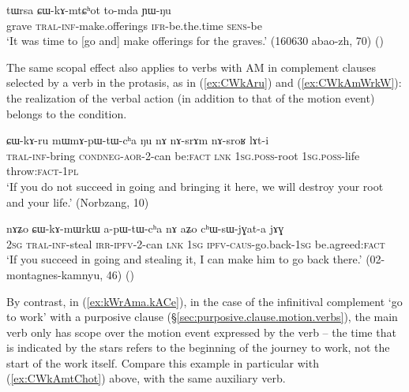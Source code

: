 \begin{exe}
\ex \label{ex:CWkAmtChot}
\gll tɯrsa ɕɯ-kɤ-mtɕʰot to-mda ɲɯ-ŋu \\
grave \textsc{tral}-\textsc{inf}-make.offerings \textsc{ifr}-be.the.time \textsc{sens}-be \\
\glt `It was time to [go and] make offerings for the graves.' (160630 abao-zh, 70) ()
 \end{exe} 
 
The same scopal effect also applies to  verbs with AM in complement clauses selected by a verb in the protasis, as in (\ref{ex:CWkAru}) and (\ref{ex:CWkAmWrkW}): the realization of the verbal action (in addition to that of the motion event) belongs to the condition.

\begin{exe}
\ex \label{ex:CWkAru}
\gll ɕɯ-kɤ-ru mɯ\redp{}mɤ-pɯ-tɯ-cʰa ŋu nɤ nɤ-srɤm nɤ-sroʁ lɤt-i \\
\textsc{tral}-\textsc{inf}-bring \textsc{cond}\redp{}\textsc{neg}-\textsc{aor}-2-can be:\textsc{fact} \textsc{lnk} \textsc{1sg}.\textsc{poss}-root \textsc{1sg}.\textsc{poss}-life throw:\textsc{fact}-\textsc{1pl} \\ 
\glt `If you do not succeed in going and bringing it here, we will destroy your root and your life.' (Norbzang, 10)
\end{exe}

\begin{exe}
\ex \label{ex:CWkAmWrkW}
\gll nɤʑo ɕɯ-kɤ-mɯrkɯ a-pɯ-tɯ-cʰa nɤ aʑo cʰɯ-sɯ-jɣat-a jɤɣ \\
\textsc{2sg} \textsc{tral}-\textsc{inf}-steal \textsc{irr}-\textsc{ipfv}-2-can \textsc{lnk} \textsc{1sg} \textsc{ipfv}-\textsc{caus}-go.back-\textsc{1sg} be.agreed:\textsc{fact} \\
\glt `If you succeed in going and stealing it, I can make him to go back there.' (02-montagnes-kamnyu, 46)
()
\end{exe}

 
By contrast, in  (\ref{ex:kWrAma.kACe}), in the case of the infinitival complement  `go to work' with a purposive clause  (§\ref{sec:purposive.clause.motion.verbs}), the main verb  only has scope over the motion event expressed by the verb  -- the time that is indicated by the stars refers to the beginning of the journey to work, not the start of the work itself. Compare this example in particular with (\ref{ex:CWkAmtChot}) above, with the same auxiliary verb.
 
